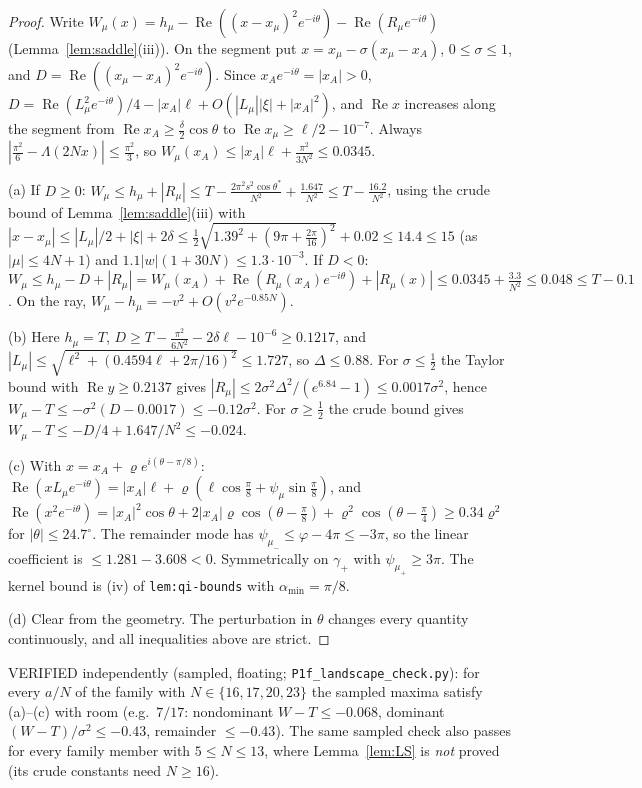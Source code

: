 \documentclass[11pt]{article}
\theoremstyle{definition}\newtheorem{definition}[theorem]{Definition}
\theoremstyle{remark}\newtheorem{remark}[theorem]{Remark}
\begin{document}
\begin{proof}
Write $W_\mu(x)=h_\mu-\operatorname{Re}((x-x_\mu)^2e^{-i\theta})-\operatorname{Re}(R_\mu e^{-i\theta})$ (Lemma~\ref{lem:saddle}(iii)). On the segment put $x=x_\mu-\sigma(x_\mu-x_A)$, $0\le\sigma\le1$, and $D=\operatorname{Re}((x_\mu-x_A)^2e^{-i\theta})$. Since $x_Ae^{-i\theta}=|x_A|>0$,
$D=\operatorname{Re}(L_\mu^2e^{-i\theta})/4-|x_A|\ell+O(|L_\mu||\xi|+|x_A|^2)$, and $\operatorname{Re}x$ increases along the segment from $\operatorname{Re}x_A\ge\frac\delta2\cos\theta$ to $\operatorname{Re}x_\mu\ge\ell/2-10^{-7}$. Always $|\frac{\pi^2}6-\Lambda(2Nx)|\le\frac{\pi^2}3$, so $W_\mu(x_A)\le|x_A|\ell+\frac{\pi^2}{3N^2}\le0.0345$.

(a) If $D\ge0$: $W_\mu\le h_\mu+|R_\mu|\le T-\frac{2\pi^2s^2\cos\theta^*}{N^2}+\frac{1.647}{N^2}\le T-\frac{16.2}{N^2}$, using the crude bound of Lemma~\ref{lem:saddle}(iii) with $|x-x_\mu|\le|L_\mu|/2+|\xi|+2\delta\le\frac12\sqrt{1.39^2+(9\pi+\frac{2\pi}{16})^2}+0.02\le14.4\le15$ (as $|\mu|\le4N+1$) and $1.1|w|(1+30N)\le1.3\cdot10^{-3}$. If $D<0$: $W_\mu\le h_\mu-D+|R_\mu|=W_\mu(x_A)+\operatorname{Re}(R_\mu(x_A)e^{-i\theta})+|R_\mu(x)|\le0.0345+\frac{3.3}{N^2}\le0.048\le T-0.1$. On the ray, $W_\mu-h_\mu=-v^2+O(v^2e^{-0.85N})$.

(b) Here $h_\mu=T$, $D\ge T-\frac{\pi^2}{6N^2}-2\delta\ell-10^{-6}\ge0.1217$, and $|L_\mu|\le\sqrt{\ell^2+(0.4594\ell+2\pi/16)^2}\le1.727$, so $\Delta\le0.88$. For $\sigma\le\frac12$ the Taylor bound with $\operatorname{Re}y\ge0.2137$ gives $|R_\mu|\le2\sigma^2\Delta^2/(e^{6.84}-1)\le0.0017\sigma^2$, hence $W_\mu-T\le-\sigma^2(D-0.0017)\le-0.12\sigma^2$. For $\sigma\ge\frac12$ the crude bound gives $W_\mu-T\le-D/4+1.647/N^2\le-0.024$.

(c) With $x=x_A+\varrho e^{i(\theta-\pi/8)}$: $\operatorname{Re}(xL_\mu e^{-i\theta})=|x_A|\ell+\varrho(\ell\cos\frac\pi8+\psi_\mu\sin\frac\pi8)$, and $\operatorname{Re}(x^2e^{-i\theta})=|x_A|^2\cos\theta+2|x_A|\varrho\cos(\theta-\frac\pi8)+\varrho^2\cos(\theta-\frac\pi4)\ge0.34\varrho^2$ for $|\theta|\le24.7^\circ$. The remainder mode has $\psi_{\mu_-}\le\varphi-4\pi\le-3\pi$, so the linear coefficient is $\le1.281-3.608<0$. Symmetrically on $\gamma_+$ with $\psi_{\mu_+}\ge3\pi$. The kernel bound is (iv) of \texttt{lem:qi-bounds} with $\alpha_{\min}=\pi/8$.

(d) Clear from the geometry. The perturbation in $\theta$ changes every quantity continuously, and all inequalities above are strict.
\end{proof}
VERIFIED independently (sampled, floating; \texttt{P1f\_landscape\_check.py}): for every $a/N$ of the family with $N\in\{16,17,20,23\}$ the sampled maxima satisfy (a)--(c) with room (e.g.\ $7/17$: nondominant $W-T\le-0.068$, dominant $(W-T)/\sigma^2\le-0.43$, remainder $\le-0.43$). The same sampled check also passes for every family member with $5\le N\le13$, where Lemma~\ref{lem:LS} is \emph{not} proved (its crude constants need $N\ge16$).
\end{document}
